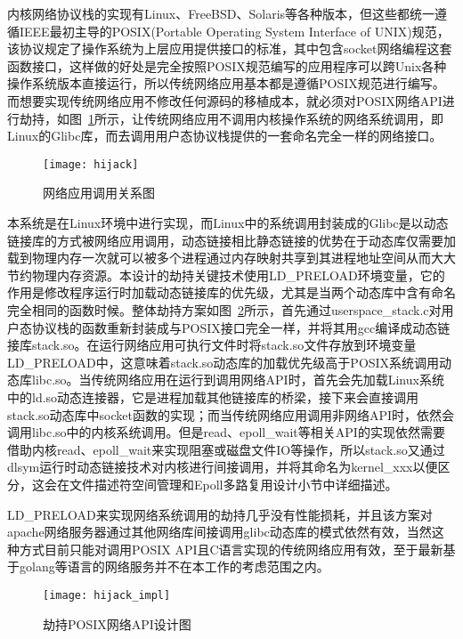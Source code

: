 内核网络协议栈的实现有Linux、FreeBSD、Solaris等各种版本，但这些都统一遵循IEEE最初主导的POSIX(Portable Operating System Interface of UNIX)规范，该协议规定了操作系统为上层应用提供接口的标准，其中包含socket网络编程这套函数接口，这样做的好处是完全按照POSIX规范编写的应用程序可以跨Unix各种操作系统版本直接运行，所以传统网络应用基本都是遵循POSIX规范进行编写。而想要实现传统网络应用不修改任何源码的移植成本，就必须对POSIX网络API进行劫持，如图~\ref{fig:hijack}所示，让传统网络应用不调用内核操作系统的网络系统调用，即Linux的Glibc库，而去调用用户态协议栈提供的一套命名完全一样的网络接口。

\vspace{-10pt}
\begin{figure}[H] %
  \centering
  \texttt{[image: hijack]}
  \caption{网络应用调用关系图}
  \label{fig:hijack}
\end{figure}
\vspace{-10pt}

本系统是在Linux环境中进行实现，而Linux中的系统调用封装成的Glibc是以动态链接库的方式被网络应用调用，动态链接相比静态链接的优势在于动态库仅需要加载到物理内存一次就可以被多个进程通过内存映射共享到其进程地址空间从而大大节约物理内存资源。本设计的劫持关键技术使用LD\_PRELOAD环境变量，它的作用是修改程序运行时加载动态链接库的优先级，尤其是当两个动态库中含有命名完全相同的函数时候。整体劫持方案如图~\ref{fig:hijack_impl}所示，首先通过userspace\_stack.c对用户态协议栈的函数重新封装成与POSIX接口完全一样，并将其用gcc编译成动态链接库stack.so。在运行网络应用可执行文件时将stack.so文件存放到环境变量LD\_PRELOAD中，这意味着stack.so动态库的加载优先级高于POSIX系统调用动态库libc.so。当传统网络应用在运行到调用网络API时，首先会先加载Linux系统中的ld.so动态连接器，它是进程加载其他链接库的桥梁，接下来会直接调用stack.so动态库中socket函数的实现；而当传统网络应用调用非网络API时，依然会调用libc.so中的内核系统调用。但是read、epoll\_wait等相关API的实现依然需要借助内核read、epoll\_wait来实现阻塞或磁盘文件IO等操作，所以stack.so又通过dlsym运行时动态链接技术对内核进行间接调用，并将其命名为kernel\_xxx以便区分，这会在文件描述符空间管理和Epoll多路复用设计小节中详细描述。

LD\_PRELOAD来实现网络系统调用的劫持几乎没有性能损耗，并且该方案对apache网络服务器通过其他网络库间接调用glibc动态库的模式依然有效，当然这种方式目前只能对调用POSIX API且C语言实现的传统网络应用有效，至于最新基于golang等语言的网络服务并不在本工作的考虑范围之内。

\vspace{-10pt}
\begin{figure}[H] %
  \centering
  \texttt{[image: hijack\_impl]}
  \caption{劫持POSIX网络API设计图}
  \label{fig:hijack_impl}
\end{figure}
\vspace{-10pt}

